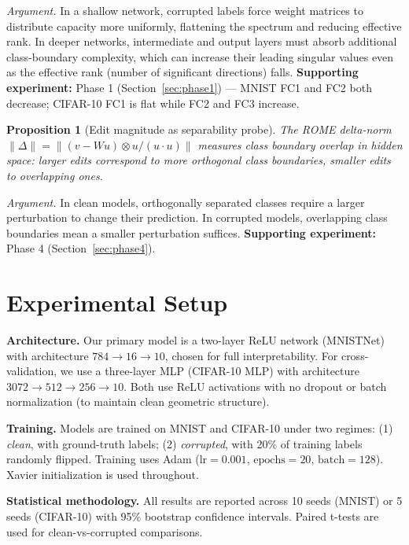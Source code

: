 \documentclass{article}
\newtheorem{proposition}{Proposition}
\begin{document}
\textit{Argument.} In a shallow network, corrupted labels force weight matrices to distribute capacity more uniformly, flattening the spectrum and reducing effective rank. In deeper networks, intermediate and output layers must absorb additional class-boundary complexity, which can increase their leading singular values even as the effective rank (number of significant directions) falls. \textbf{Supporting experiment:} Phase 1 (Section~\ref{sec:phase1}) — MNIST FC1 and FC2 both decrease; CIFAR-10 FC1 is flat while FC2 and FC3 increase.

\begin{proposition}[Edit magnitude as separability probe]
\label{prop:rome}
The ROME delta-norm $\|\Delta\| = \|(v - Wu) \otimes u / (u \cdot u)\|$ measures class boundary overlap in hidden space: larger edits correspond to more orthogonal class boundaries, smaller edits to overlapping ones.
\end{proposition}

\textit{Argument.} In clean models, orthogonally separated classes require a larger perturbation to change their prediction. In corrupted models, overlapping class boundaries mean a smaller perturbation suffices. \textbf{Supporting experiment:} Phase 4 (Section~\ref{sec:phase4}).

\section{Experimental Setup}
\label{sec:setup}

\textbf{Architecture.} Our primary model is a two-layer ReLU network (MNISTNet) with architecture $784 \to 16 \to 10$, chosen for full interpretability. For cross-validation, we use a three-layer MLP (CIFAR-10 MLP) with architecture $3072 \to 512 \to 256 \to 10$. Both use ReLU activations with no dropout or batch normalization (to maintain clean geometric structure).

\textbf{Training.} Models are trained on MNIST and CIFAR-10 under two regimes: (1) \textit{clean}, with ground-truth labels; (2) \textit{corrupted}, with 20\% of training labels randomly flipped. Training uses Adam ($\text{lr}=0.001$, $\text{epochs}=20$, $\text{batch}=128$). Xavier initialization is used throughout.

\textbf{Statistical methodology.} All results are reported across 10 seeds (MNIST) or 5 seeds (CIFAR-10) with 95\% bootstrap confidence intervals. Paired t-tests are used for clean-vs-corrupted comparisons.
\end{document}
